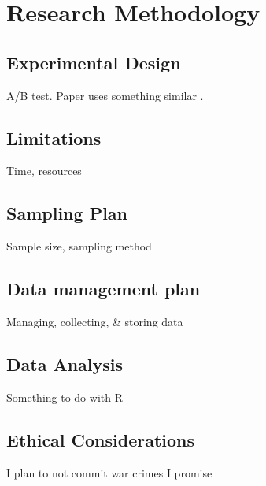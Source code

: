 \section{Research Methodology}

\subsection{Experimental Design}
A/B test. Paper uses something similar \cite{constrained-layouts}.
\subsection{Limitations}
Time, resources

\subsection{Sampling Plan}
Sample size, sampling method

\subsection{Data management plan}
Managing, collecting, \& storing data

\subsection{Data Analysis}
Something to do with R

\subsection{Ethical Considerations}
I plan to not commit war crimes I promise